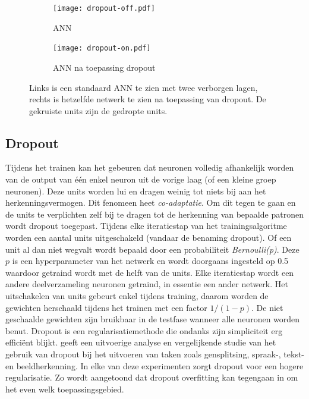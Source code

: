 \begin{figure}[!t]
	\centering
	\begin{subfigure}{.5\textwidth}
		\centering
		\texttt{[image: dropout-off.pdf]}
		\caption{ANN}
		\label{fig:neuron}
	\end{subfigure}%
	\begin{subfigure}{.5\textwidth}
		\centering
		\texttt{[image: dropout-on.pdf]}
		\caption{ANN na toepassing dropout}
		\label{fig:ANN}
	\end{subfigure}
	\caption{Links is een standaard ANN te zien met twee verborgen lagen, rechts is hetzelfde netwerk te zien na toepassing van dropout. De gekruiste units zijn de gedropte units.}
	\label{fig:test}
\end{figure}
\subsection{Dropout}
Tijdens het trainen kan het gebeuren dat neuronen volledig afhankelijk worden van de output van \'e\'en enkel neuron uit de vorige laag (of een kleine groep neuronen). Deze units worden lui en dragen weinig tot niets bij aan het herkenningsvermogen. Dit fenomeen heet \textit{co-adaptatie}. Om dit tegen te gaan en de units te verplichten zelf bij te dragen tot de herkenning van bepaalde patronen wordt dropout toegepast.
\npar Tijdens elke iteratiestap van het trainingsalgoritme worden een aantal units uitgeschakeld (vandaar de benaming dropout). Of een unit al dan niet wegvalt wordt bepaald door een probabiliteit \textit{Bernoulli(p)}. Deze $p$ is een hyperparameter van het netwerk en wordt doorgaans ingesteld op 0.5 waardoor getraind wordt met de helft van de units. Elke iteratiestap wordt een andere deelverzameling neuronen getraind, in essentie een ander netwerk. Het uitschakelen van units gebeurt enkel tijdens training, daarom worden de gewichten herschaald tijdens het trainen met een factor $1/(1-p)$. De niet geschaalde gewichten zijn bruikbaar in de testfase wanneer alle neuronen worden benut.
\npar Dropout is een regularisatiemethode die ondanks zijn simpliciteit erg effici\"ent blijkt. \cite{dropout} geeft een uitvoerige analyse en vergelijkende studie van het gebruik van dropout bij het uitvoeren van taken zoals gensplitsing, spraak-, tekst- en beeldherkenning. In elke van deze experimenten zorgt dropout voor een hogere regularisatie. Zo wordt aangetoond dat dropout overfitting kan tegengaan in om het even welk toepassingsgebied.

